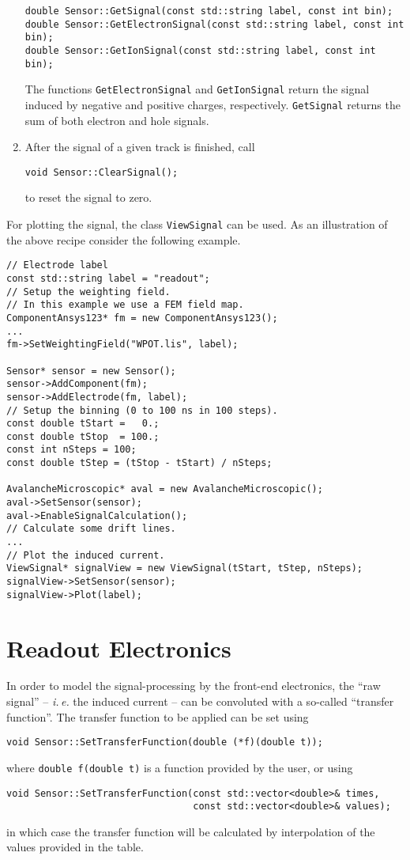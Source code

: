 \begin{enumerate}
  \begin{lstlisting}
double Sensor::GetSignal(const std::string label, const int bin);
double Sensor::GetElectronSignal(const std::string label, const int bin);
double Sensor::GetIonSignal(const std::string label, const int bin); 
  \end{lstlisting}
  The functions \texttt{GetElectronSignal} and 
  \texttt{GetIonSignal} return the signal induced by negative 
  and positive charges, respectively. \texttt{GetSignal} returns 
  the sum of both electron and hole signals.   
  \item
  After the signal of a given track is finished, call
  \begin{lstlisting}
void Sensor::ClearSignal();
  \end{lstlisting}
  to reset the signal to zero.
\end{enumerate}

For plotting the signal, the class \texttt{ViewSignal} can be used.
As an illustration of the above recipe consider the following example. 
\begin{lstlisting}
// Electrode label
const std::string label = "readout";
// Setup the weighting field.
// In this example we use a FEM field map.
ComponentAnsys123* fm = new ComponentAnsys123();
...
fm->SetWeightingField("WPOT.lis", label);

Sensor* sensor = new Sensor();
sensor->AddComponent(fm);
sensor->AddElectrode(fm, label);
// Setup the binning (0 to 100 ns in 100 steps).
const double tStart =   0.;
const double tStop  = 100.;
const int nSteps = 100;
const double tStep = (tStop - tStart) / nSteps;

AvalancheMicroscopic* aval = new AvalancheMicroscopic();
aval->SetSensor(sensor);
aval->EnableSignalCalculation();
// Calculate some drift lines.
...
// Plot the induced current.
ViewSignal* signalView = new ViewSignal(tStart, tStep, nSteps);
signalView->SetSensor(sensor);
signalView->Plot(label);
\end{lstlisting}

\section{Readout Electronics}

In order to model the signal-processing by the front-end electronics, the 
``raw signal'' -- \textit{i.\,e.} the induced current -- 
can be convoluted with a so-called ``transfer function''. 
The transfer function to be applied can be set using
\begin{lstlisting}
void Sensor::SetTransferFunction(double (*f)(double t));
\end{lstlisting}
where \texttt{double f(double t)} is a function provided by the user, 
or using
\begin{lstlisting}
void Sensor::SetTransferFunction(const std::vector<double>& times,
                                 const std::vector<double>& values);
\end{lstlisting}
in which case the transfer function will be calculated by 
interpolation of the values provided in the table.

